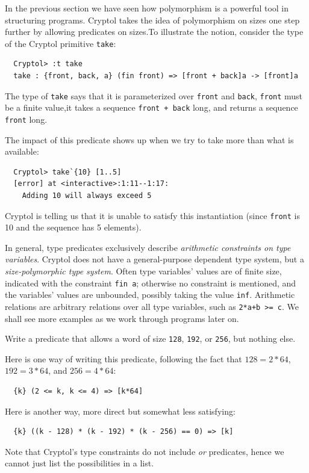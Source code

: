 
In the previous section we have seen how polymorphism is a powerful
tool in structuring programs. Cryptol takes the idea of polymorphism
on sizes one step further by allowing predicates on
sizes.\indPredicates To illustrate the notion, consider the type of
the Cryptol primitive {\tt take}\indTake:
\begin{Verbatim}
  Cryptol> :t take
  take : {front, back, a} (fin front) => [front + back]a -> [front]a
\end{Verbatim}

The type of {\tt take} says that it is parameterized over {\tt front}
and {\tt back}, {\tt front} must be a finite value,\indFin it takes a
sequence {\tt front + back} long, and returns a sequence {\tt front} long.

The impact of this predicate shows up when we try to take more than
what is available:
\begin{Verbatim}
  Cryptol> take`{10} [1..5]
  [error] at <interactive>:1:11--1:17:
    Adding 10 will always exceed 5
\end{Verbatim}
Cryptol is telling us that it is unable to satisfy this instantiation
(since {\tt front} is 10 and the sequence has 5
elements).\indTake\indPredicates

In general, type predicates exclusively describe \textit{arithmetic
  constraints on type variables}.  Cryptol does not have a
general-purpose dependent type system, but a \emph{size-polymorphic
  type system}.  Often type variables' values are of finite size,
indicated with the constraint {\tt fin a}\indFin; otherwise no
constraint is mentioned, and the variables' values are unbounded,
possibly taking the value \texttt{inf}\indInf.  Arithmetic
relations are arbitrary relations over all type variables, such as
{\tt 2*a+b >= c}.  We shall see more examples as we work through
programs later on.

\begin{Exercise}\label{ex:preds:1}
  Write a predicate that allows a word of size {\tt 128}, {\tt 192},
  or {\tt 256}, but nothing else.
\end{Exercise}
\begin{Answer}\indPredicates
  Here is one way of writing this predicate, following the fact that
  $128 = 2 * 64$, $192 = 3 * 64$, and $256 = 4 * 64$:
\begin{verbatim}
  {k} (2 <= k, k <= 4) => [k*64]
\end{verbatim}
Here is another way, more direct but somewhat less satisfying:
\begin{verbatim}
  {k} ((k - 128) * (k - 192) * (k - 256) == 0) => [k]
\end{verbatim}
Note that Cryptol's type constraints do not include {\em or} predicates,
hence we cannot just list the possibilities in a list.
\end{Answer}


